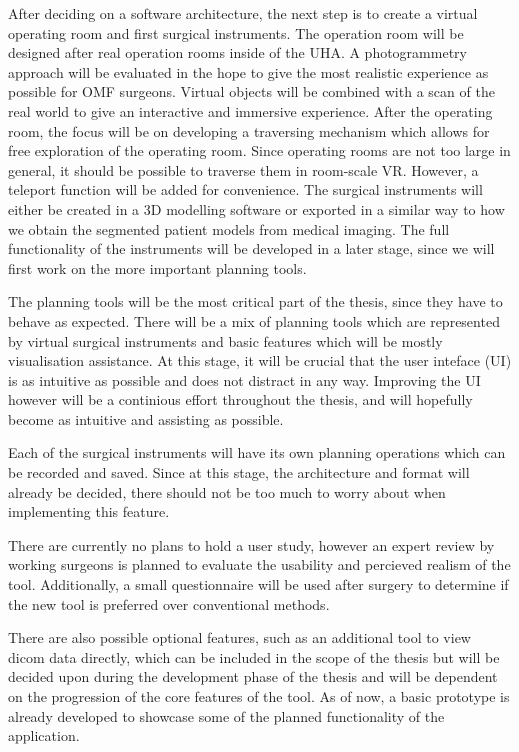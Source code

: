 After deciding on a software architecture, the next step is to create a virtual operating room and first surgical instruments.
The operation room will be designed after real operation rooms inside of the UHA.
A photogrammetry approach will be evaluated in the hope to give the most realistic experience as possible for OMF surgeons.
Virtual objects will be combined with a scan of the real world to give an interactive and immersive experience.
After the operating room, the focus will be on developing a traversing mechanism which allows for free exploration of the operating room.
Since operating rooms are not too large in general, it should be possible to traverse them in room-scale VR.
However, a teleport function will be added for convenience.
The surgical instruments will either be created in a 3D modelling software or exported in a similar way to how we obtain the segmented patient models from medical imaging.
The full functionality of the instruments will be developed in a later stage, since we will first work on the more important planning tools.

The planning tools will be the most critical part of the thesis, since they have to behave as expected.
There will be a mix of planning tools which are represented by virtual surgical instruments and basic features which will be mostly visualisation assistance.
At this stage, it will be crucial that the user inteface (UI) is as intuitive as possible and does not distract in any way.
Improving the UI however will be a continious effort throughout the thesis, and will hopefully become as intuitive and assisting as possible.

Each of the surgical instruments will have its own planning operations which can be recorded and saved.
Since at this stage, the architecture and format will already be decided, there should not be too much to worry about when implementing this feature.

There are currently no plans to hold a user study, however an expert review by working surgeons is planned to evaluate the usability and percieved realism of the tool.
Additionally, a small questionnaire will be used after surgery to determine if the new tool is preferred over conventional methods.

There are also possible optional features, such as an additional tool to view dicom data directly, which can be included in the scope of the thesis but will be decided upon during the development phase of the thesis and will be dependent on the progression of the core features of the tool.
As of now, a basic prototype is already developed to showcase some of the planned functionality of the application.




